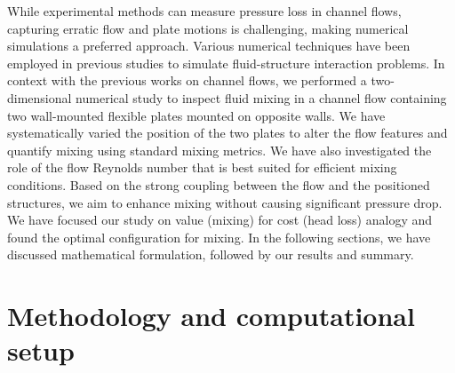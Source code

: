 \documentclass[reprint,a4paper,fleqn]{cas-dc} %
\begin{document}
	While experimental methods can measure pressure loss in channel flows, capturing erratic flow and plate motions is challenging, making numerical simulations a preferred approach. Various numerical techniques have been employed in previous studies to simulate fluid-structure interaction problems. In context with the previous works on channel flows, we performed a two-dimensional numerical study to inspect fluid mixing in a channel flow containing two wall-mounted flexible plates mounted on opposite walls. We have systematically varied the position of the two plates to alter the flow features and quantify mixing using standard mixing metrics. We have also investigated the role of the flow Reynolds number that is best suited for efficient mixing conditions. Based on the strong coupling between the flow and the positioned structures, we aim to enhance mixing without causing significant pressure drop. We have focused our study on value (mixing) for cost (head loss) analogy and found the optimal configuration for mixing. In the following sections, we have discussed mathematical formulation, followed by our results and summary.


	\section{Methodology and computational setup}\label{sec:maths}
\end{document}
